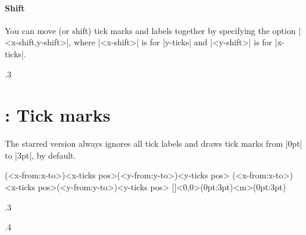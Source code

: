 \paragraph{Shift}

You can move (or shift) tick marks and labels together by specifying the option |<x-shift,y-shift>|, where |<x-shift>| is for |y-ticks| and |<y-shift>| is for |x-ticks|.

\begin{tzcode}{.3}
\end{tzcode}





\section{\protect\cmd{\tzticks*}: Tick marks}
\label{s:tzticks*}

The starred version \icmd{\tzticks*} always ignores all tick labels and draws tick marks from |0pt| to |3pt|, by default.

\begin{tzdef}{}
\tzticks*(<x-from:x-to>){<x-ticks pos>}(<y-from:y-to>){<y-ticks pos>}
         (<x-from:x-to>){<x-ticks pos>}(<y-from:y-to>){<y-ticks pos>}
  []<0,0>(0pt:3pt){<m>}(0pt:3pt){}
\end{tzdef}

\begin{tzcode}{.3}
{}
\end{tzcode}

\begin{tzcode}{.4}
\end{tzcode}


